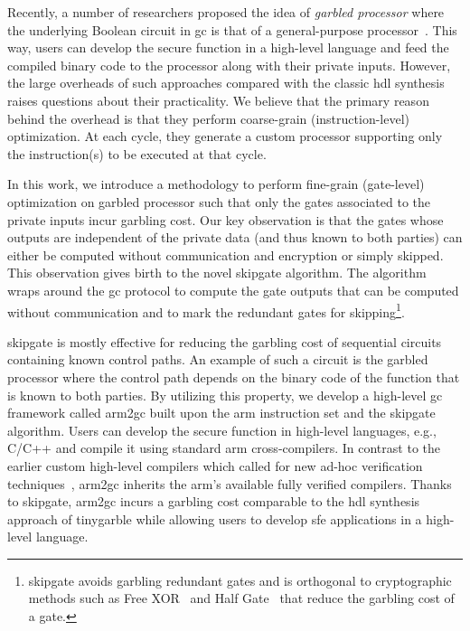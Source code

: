 Recently, a number of researchers proposed the idea of \textit{garbled processor} where the underlying Boolean circuit in \acrshort{gc} is that of a general-purpose processor~\cite{wang2016secure, songhori2016garbledcpu}.
This way, users can develop the secure function in a high-level language and feed the compiled binary code to the processor along with their private inputs.
However, the large overheads of such approaches compared with the classic \acrshort{hdl} synthesis raises questions about their practicality.
We believe that the primary reason behind the overhead is that they perform coarse-grain (instruction-level) optimization.
At each cycle, they generate a custom processor supporting only the instruction(s) to be executed at that cycle.

In this work, we introduce a methodology to perform fine-grain (gate-level) optimization on garbled processor such that only the gates associated to the private inputs incur garbling cost.
Our key observation is that the gates whose outputs are independent of the private data (and thus known to both parties) can either be computed without communication and encryption or simply skipped.
This observation gives birth to the novel \gls{skipgate} algorithm.
The algorithm wraps around the \acrshort{gc} protocol to compute the gate outputs that can be computed without communication and to mark the redundant gates for skipping\footnote{\gls{skipgate} avoids garbling redundant gates and is orthogonal to cryptographic methods such as Free XOR~\cite{kolesnikov2008improved} and Half Gate~\cite{zahur2015two} that reduce the garbling cost of a gate.}.

\gls{skipgate} is mostly effective for reducing the garbling cost of sequential circuits~\cite{songhori2015tinygarble} containing known control paths.
An example of such a circuit is the garbled processor where the control path depends on the binary code of the function that is known to both parties.
By utilizing this property, we develop a high-level \acrshort{gc} framework called \gls{arm2gc} built upon the \gls{arm} instruction set and the \gls{skipgate} algorithm.
Users can develop the secure function in high-level languages, e.g., C/C++ and compile it using standard \gls{arm} cross-compilers.
In contrast to the earlier custom high-level compilers which called for new ad-hoc verification techniques~\cite{rastogi2014wysteria,demmler2015aby,liu2015oblivm,mood2016frigate}, \gls{arm2gc} inherits the \gls{arm}'s available fully verified compilers.
Thanks to \gls{skipgate}, \gls{arm2gc} incurs a garbling cost comparable to the \acrshort{hdl} synthesis approach of \gls{tinygarble} while allowing users to develop \acrshort{sfe} applications in a high-level language.

